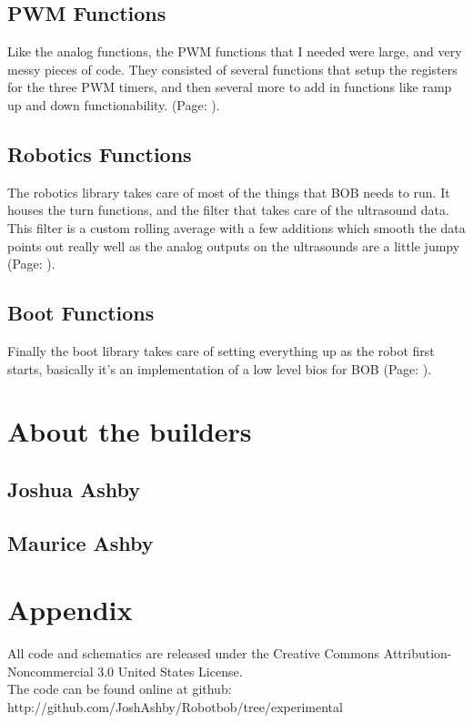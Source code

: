 \documentclass{article}
\begin{document}
\subsection{PWM Functions}
Like the analog functions, the PWM functions that I needed were large, and very messy pieces of code. They consisted of several functions that setup the registers for the three PWM timers, and then several more to add in functions like ramp up and down functionability. (Page: \pageref{pwm}).\\
\subsection{Robotics Functions}
The robotics library takes care of most of the things that BOB needs to run. It houses the turn functions, and the filter that takes care of the  ultrasound data. This filter is a custom rolling average with a few additions which smooth the data points out really well as the analog outputs on the ultrasounds are a little jumpy (Page: \pageref{robot}).\\
\subsection{Boot Functions}
Finally the boot library takes care of setting everything up as the robot first starts, basically it's an implementation of a low level bios for BOB (Page: \pageref{boot}).\\
\newpage
\section{About the builders}
\subsection{Joshua Ashby}
\subsection{Maurice Ashby}

\newpage
\section{Appendix}
All code and schematics are released under the Creative Commons Attribution-Noncommercial 3.0 United States License.\\
The code can be found online at github: http://github.com/JoshAshby/Robotbob/tree/experimental\\
\end{document}
